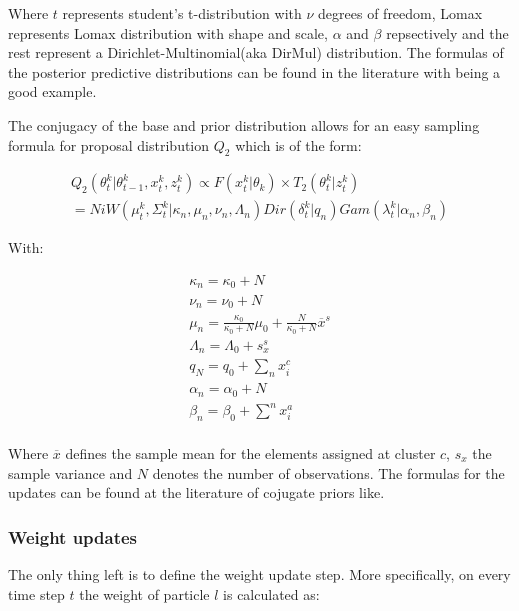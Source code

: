 \documentclass[twoside,hidelinks]{article}
\begin{document}
Where $t$ represents student's t-distribution with $\nu$ degrees of freedom, Lomax represents Lomax distribution with shape and scale, $\alpha$ and $\beta$ repsectively and the rest represent a Dirichlet-Multinomial(aka DirMul) distribution. The formulas of the posterior predictive distributions can be found in the literature with \cite{compendium} being a good example. 

The conjugacy of the base and prior distribution allows for an easy sampling formula for proposal distribution $Q_2$ which is of the form: 


\begin{equation} \label{Q_2}
\begin{split}
Q_2(\theta_t^k | \theta_{t-1}^k , x_t^k, z_t^k) \propto F( x_t^k | \theta_k) \times T_2(\theta_t^k | z_t^k) \\
= NiW( \mu_t^k, \Sigma_t^k | \kappa_n, \mu_n, \nu_n, \Lambda_n ) Dir(\delta_t^k | q_n) Gam(\lambda_t^k | \alpha_n, \beta_n)
\end{split}
\end{equation}

With:

\begin{equation} \label{udpates}
\begin{split}
\kappa_n = \kappa_0 + N \\
\nu_n = \nu_0 + N \\
\mu_n = \frac{\kappa_0}{\kappa_0 + N} \mu_0 +  \frac{N}{\kappa_0 + N} \overline{x}^s\\
\Lambda_n = \Lambda_0 + s_{x}^s\\
q_N = q_0 +  \sum_n x_i^c\\
\alpha_n = \alpha_0 +  N\\
\beta_n = \beta_0 +  \sum^n x_i^a\\
\end{split}
\end{equation}


Where $\overline{x}$ defines the sample mean for the elements assigned at cluster $c$, $s_{x}$ the sample variance and $N$ denotes the number of observations. The formulas for the updates can be found at the literature of cojugate priors like\cite{conjugate}.

\subsubsection{Weight updates}

The only thing left is to define the weight update step. More specifically, on every time step $t$ the weight of particle $l$ is calculated as:
\end{document}
